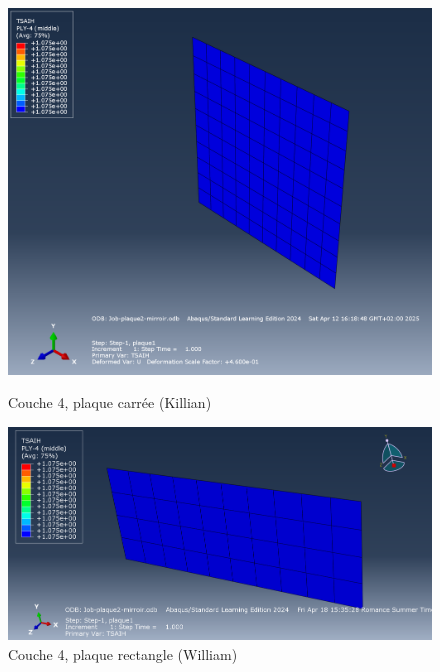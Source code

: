 \documentclass[a4paper,12pt]{article}
\begin{document}
\begin{figure}[H]
	\centering
	\begin{minipage}{0.495\textwidth}
		\centering
		\includegraphics[width=\textwidth]{media/K_P2_L4-5_12042025.png} %
		\caption{Couche 4, plaque carrée (Killian)}
		\label{fig:image1}
	\end{minipage}
	\hfill
	\begin{minipage}{0.495\textwidth}
		\centering
		\includegraphics[width=\textwidth]{media/Couche4_mirroir.png} %
		\caption{Couche 4, plaque rectangle (William)}
		\label{fig:image2}
	\end{minipage}
\end{figure}
\end{document}
